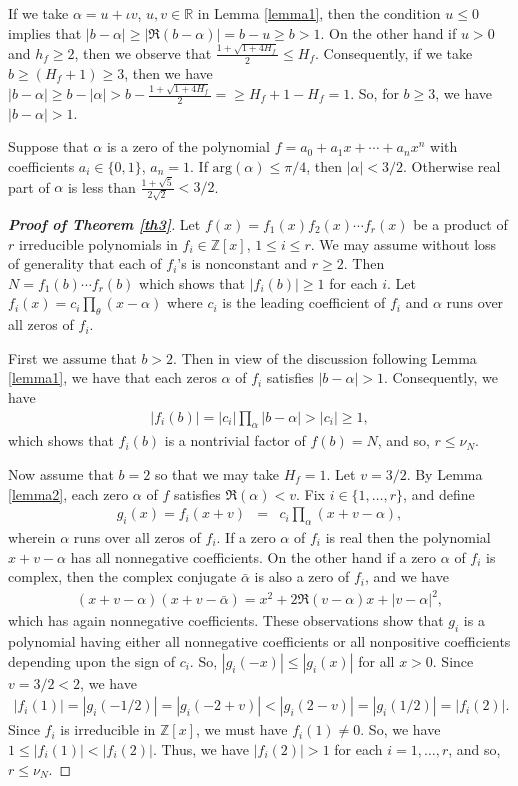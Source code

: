 \documentclass[12pt,reqno]{amsart}%
\begin{document}
 If we take $\alpha=u+\iota v$, $u,v\in \mathbb{R}$ in Lemma \ref{lemma1}, then the condition $u\leq 0$ implies that $|b-\alpha|\geq |\mathfrak{R}(b-\alpha)|=b-u\geq b>1$. On the other hand if $u>0$ and $h_f\geq 2$, then we observe that $\frac{1+\sqrt{1+4H_f}}{2}\leq H_f$. Consequently,  if we take $b\geq (H_f+1)\geq 3$,  then we have $|b-\alpha|\geq b-|\alpha|> b-\frac{1+\sqrt{1+4H_f}}{2}=\geq H_f+1-H_f=1$. So, for $b\geq 3$, we have $|b-\alpha|>1$.
\begin{lemmax}[\cite{Mu}]\label{lemma2}
   Suppose that $\alpha$ is a zero of the polynomial  $f=a_0+a_1 x+\cdots+a_n x^n$ with coefficients $a_i\in \{0,1\}$, $a_n=1$. If $\text{arg}(\alpha)\leq \pi/4$, then $|\alpha|<3/2$. Otherwise real part of $\alpha$ is less than $\frac{1+\sqrt{5}}{2\sqrt{2}}<3/2$.
\end{lemmax}
\begin{proof}[\bf Proof of Theorem \ref{th3}] Let $f(x)=f_1(x)f_2(x)\cdots f_r(x)$ be a product of $r$ irreducible polynomials in $f_i\in\mathbb Z[x]$, $1\leq i\leq r$. We may assume without loss of generality that each of $f_i$'s is nonconstant and $r\geq 2$. Then $N=f_1(b)\cdots f_r(b)$ which shows that $|f_i(b)|\geq 1$ for each $i$. Let $f_i(x)=c_i \prod_{\theta} (x-\alpha)$ where $c_i$ is the leading coefficient of $f_i$ and $\alpha$ runs over all zeros of $f_i$.

First we assume that $b>2$. Then in view of the discussion following Lemma \ref{lemma1}, we have that  each zeros $\alpha$ of $f_i$ satisfies $|b-\alpha|>1$. Consequently,  we have
\begin{eqnarray*}
|f_i(b)|=|c_i|\prod_\alpha |b-\alpha|>|c_i|\geq 1,
\end{eqnarray*}
which shows that $f_i(b)$ is a nontrivial factor of $f(b)=N$, and so, $r\leq \nu_N$.

Now assume that $b=2$ so that we may take $H_f=1$. Let $v=3/2$. By Lemma \ref{lemma2}, each zero $\alpha$ of $f$ satisfies $\mathfrak{R}(\alpha)<v$. Fix $i\in \{1,\ldots,r\}$, and define
\begin{eqnarray*}
g_i(x)=f_i(x+v) &=& c_i\prod_\alpha (x+v-\alpha),
\end{eqnarray*}
wherein $\alpha$ runs over all zeros of $f_i$. If a zero $\alpha$ of $f_i$ is real then the polynomial $x+v-\alpha$ has all nonnegative coefficients. On the other hand if a zero $\alpha$ of $f_i$ is complex, then the complex conjugate $\bar{\alpha}$ is also a zero of $f_i$, and we have
\begin{eqnarray*}
(x+v-\alpha)(x+v-\bar{\alpha})=x^2+2\mathfrak{R}(v-\alpha)x+|v-\alpha|^2,
\end{eqnarray*}
which has again nonnegative coefficients. These observations show that $g_i$ is a polynomial having either all nonnegative coefficients or all nonpositive coefficients depending upon the sign of $c_i$. So, $|g_i(-x)|\leq |g_i(x)|$ for all $x>0$. Since $v=3/2<2$, we have
\begin{eqnarray*}
|f_i(1)|=|g_i(-1/2)|=|g_i(-2+v)|<|g_i(2-v)|=|g_i(1/2)|=|f_i(2)|.
\end{eqnarray*}
Since $f_i$ is irreducible in $\mathbb{Z}[x]$, we must have $f_i(1)\neq 0$. So, we have $1\leq |f_i(1)|<|f_i(2)|$. Thus, we have $|f_i(2)|>1$ for each $i=1,\ldots,r$, and so, $r\leq \nu_N$.
\end{proof}
\end{document}
